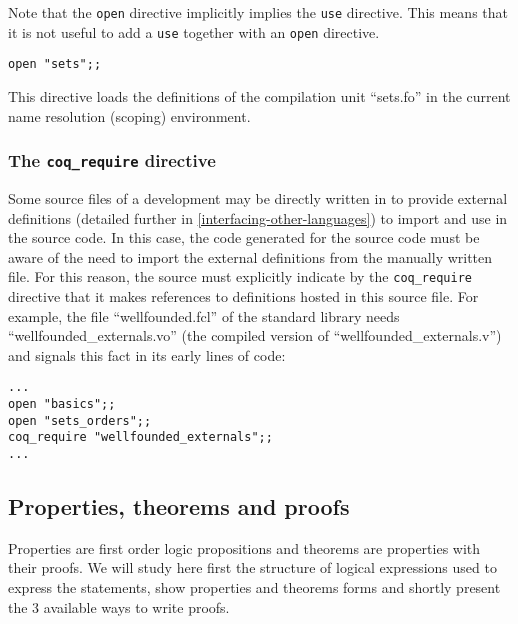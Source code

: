 Note that the {\tt open} directive implicitly implies the {\tt use}
directive. This means that it is not useful to add a {\tt use}
together with an {\tt open} directive.

{\scriptsize
\begin{lstlisting}
open "sets";;
\end{lstlisting}
}This directive loads the definitions of the compilation unit
``sets.fo'' in the current name resolution (scoping) environment.




\subsubsection{The {\tt coq\_require} directive}
Some source files of a development may be directly written in {\coq} to
provide external definitions (detailed further in
\ref{interfacing-other-languages}) to import and use in the %
{\focal} source code. In this case, the {\coq} code generated for the
{\focal} source code must be aware of the need to import the external
definitions from the manually written {\coq} file. For this reason, the
{\focal} source must explicitly indicate by the {\tt coq\_require}
directive that it makes references to definitions hosted in this
{\coq} source file. For example, the file ``wellfounded.fcl'' of the
standard library needs ``wellfounded\_externals.vo'' (the compiled version of
``wellfounded\_externals.v'') and signals this
fact in its early lines of code:

{\scriptsize
\begin{lstlisting}
...
open "basics";;
open "sets_orders";;
coq_require "wellfounded_externals";;
...
\end{lstlisting}}



\subsection{Properties, theorems and proofs}
\label{properties-theorems-proofs}

Properties are first order logic propositions and theorems are
properties with their proofs. We will study here first the structure
of logical expressions used to express the statements, show properties
and theorems forms and shortly present the 3 available ways to write
proofs.



